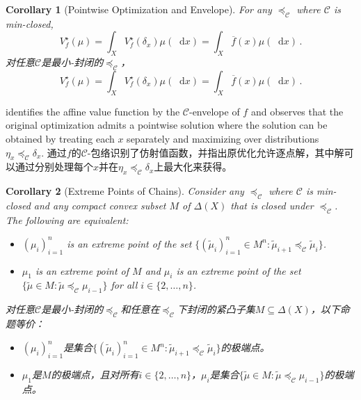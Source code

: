 \documentclass[12pt,letterpaper]{article}
\newenvironment{original}{\color{black}}{}
\newenvironment{translation}{\color{blue}}{}
\theoremstyle{plain}
\newtheorem{cor}{Corollary}
\theoremstyle{definition}
\theoremstyle{remark}
\newcommand{\C}{\mathcal{C}}
\renewcommand*\d{\mathop{}\!\mathrm{d}}
\theoremstyle{definition}
\begin{document}
\begin{cor}[Pointwise Optimization and Envelope]\label{cor:pointwise}
\begin{original}
For any $\preceq_\C$ where $\C$ is min-closed, \[
V^\star_f(\mu)=\int_X V^\star_f(\delta_x)\mu(\d x) = \int_X \overline{f}(x) \mu(\d x)\,.
\]
\end{original}
\begin{translation}
对任意$\C$是最小-封闭的$\preceq_\C$，\[
V^\star_f(\mu)=\int_X V^\star_f(\delta_x)\mu(\d x) = \int_X \overline{f}(x) \mu(\d x)\,.
\]
\end{translation}
\end{cor}

\begin{original}
 identifies the affine value function by the $\C$-envelope of $f$ and observes that the original optimization admits a pointwise solution where the solution can be obtained by treating each $x$ separately and maximizing over distributions $\eta_x \preceq_\C \delta_x$.
\end{original}
\begin{translation}
通过$f$的$\C$-包络识别了仿射值函数，并指出原优化允许逐点解，其中解可以通过分别处理每个$x$并在$\eta_x \preceq_\C \delta_x$上最大化来获得。
\end{translation}

\begin{cor}[Extreme Points of Chains]\label{cor:chain}
\begin{original}
Consider any $\preceq_\C$ where $\C$ is min-closed and any compact convex subset $M$ of $\Delta(X)$ that is closed under $\preceq_\mathcal{C}$. The following are equivalent:
\begin{itemize}
    \item[(a)] $(\mu_i)_{i=1}^n$ is an extreme point of the set $\{(\tilde{\mu}_i)_{i=1}^n \in M^n: \tilde{\mu}_{i+1} \preceq_\C \tilde{\mu}_i\}$.
    \item[(b)] $\mu_1$ is an extreme point of $M$ and $\mu_{i}$ is an extreme point of the set $\{\tilde{\mu} \in M: \tilde{\mu} \preceq_\C \mu_{i-1}\}$ for all $i \in \{2,\ldots,n\}$.
\end{itemize}
\end{original}
\begin{translation}
对任意$\C$是最小-封闭的$\preceq_\C$和任意在$\preceq_\mathcal{C}$下封闭的紧凸子集$M \subseteq \Delta(X)$，以下命题等价：
\begin{itemize}
    \item[(a)] $(\mu_i)_{i=1}^n$是集合$\{(\tilde{\mu}_i)_{i=1}^n \in M^n: \tilde{\mu}_{i+1} \preceq_\C \tilde{\mu}_i\}$的极端点。
    \item[(b)] $\mu_1$是$M$的极端点，且对所有$i \in \{2,\ldots,n\}$，$\mu_i$是集合$\{\tilde{\mu} \in M: \tilde{\mu} \preceq_\C \mu_{i-1}\}$的极端点。
\end{itemize}
\end{translation}
\end{cor}
\end{document}
